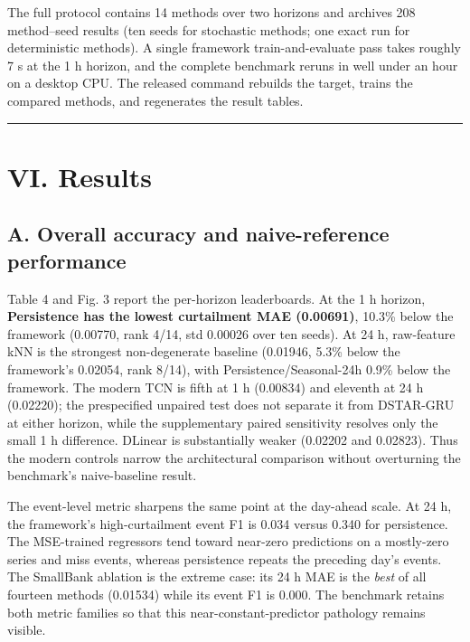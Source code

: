 \documentclass[
  10pt,
  a4paper,
]{article}
\begin{document}
The full protocol contains 14 methods over two horizons and archives 208
method--seed results (ten seeds for stochastic methods; one exact run
for deterministic methods). A single framework train-and-evaluate pass
takes roughly 7 s at the 1 h horizon, and the complete benchmark reruns
in well under an hour on a desktop CPU. The released command rebuilds
the target, trains the compared methods, and regenerates the result
tables.

\begin{center}\rule{0.5\linewidth}{0.5pt}\end{center}

\section{VI. Results}\label{vi.-results}

\subsection{A. Overall accuracy and naive-reference
performance}\label{a.-overall-accuracy-and-naive-reference-performance}

Table 4 and Fig. 3 report the per-horizon leaderboards. At the 1 h
horizon, \textbf{Persistence has the lowest curtailment MAE (0.00691)},
10.3\% below the framework (0.00770, rank 4/14, std 0.00026 over ten
seeds). At 24 h, raw-feature kNN is the strongest non-degenerate
baseline (0.01946, 5.3\% below the framework's 0.02054, rank 8/14), with
Persistence/Seasonal-24h 0.9\% below the framework. The modern TCN is
fifth at 1 h (0.00834) and eleventh at 24 h (0.02220); the prespecified
unpaired test does not separate it from DSTAR-GRU at either horizon,
while the supplementary paired sensitivity resolves only the small 1 h
difference. DLinear is substantially weaker (0.02202 and 0.02823). Thus
the modern controls narrow the architectural comparison without
overturning the benchmark's naive-baseline result.

The event-level metric sharpens the same point at the day-ahead scale.
At 24 h, the framework's high-curtailment event F1 is 0.034 versus 0.340
for persistence. The MSE-trained regressors tend toward near-zero
predictions on a mostly-zero series and miss events, whereas persistence
repeats the preceding day's events. The SmallBank ablation is the
extreme case: its 24 h MAE is the \emph{best} of all fourteen methods
(0.01534) while its event F1 is 0.000. The benchmark retains both metric
families so that this near-constant-predictor pathology remains visible.
\end{document}
